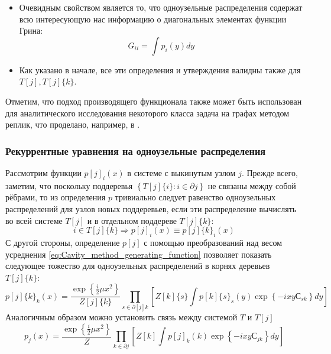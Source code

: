\begin{itemize}
	\item Очевидным свойством является то, что одноузельные распределения содержат всю интересующую нас информацию о диагональных элементах функции Грина:
	\begin{equation}
	\label{eq:Cavity_method_GF_diagonal_elements_through_single_field_distrivution}
	G_{ii} = \int p_i(y) dy
	\end{equation}
	\item Как указано в начале, все эти определения и утверждения валидны также для $T[j], T[j]\{k\}$.
\end{itemize}
Отметим, что подход производящего функционала также может быть использован для аналитического исследования некоторого класса задача на графах методом реплик, что проделано, например, в \cite{Rodgers_Bray_1988}.

\subsubsection{Рекуррентные уравнения на одноузельные распределения}
Рассмотрим функции $p[j]_i(x)$ в системе с выкинутым узлом $j$. Прежде всего, заметим, что поскольку поддеревья $\left\{ T[j]\{i\}: i \in \partial j \right\}$ не связаны между собой рёбрами, то из определения $p$ тривиально следует равенство одноузельных распределений для узлов новых поддеревьев, если эти распределение вычислять во всей системе $T[j]$ и в отдельном поддереве $T[j]\{k\}$:
$$
i \in  T[j]\{k\} \Rightarrow p[j]_i(x) \equiv p[j]\{k\}_i(x)
$$
С другой стороны, определение $p[j]$ с помощью преобразований над весом усреднения \eqref{eq:Cavity_method_generating_function} позволяет показать следующее тожество для одноузельных распределений в корнях деревьев $T[j]\{k\}$:
\begin{equation}
	\label{eq:Single_field_cavity_distribution_recurrence_relation}
	p[j]\{k\}_k(x) = \frac{\exp\left\{ \frac{i}{2}\mu x^2\right\} }{Z[j]\{k\}} \prod\limits_{s \in \partial[j]k} \left[Z[k]\{s\} \int p[k]\{s\}_s(y) \exp\left\{ -i x y С_{sk} \right\} dy \right]
\end{equation}
Аналогичным образом можно установить связь между системой $T$ и $T[j]$
\begin{equation}
	\label{eq:Single_field_distribution_though_cavity_distributions}
	p_j(x) = \frac{\exp\left\{ \frac{i}{2}\mu x^2\right\} }{Z} \prod\limits_{k \in \partial j} \left[Z[k] \int p[j]_k(k) \exp\left\{ -i x y С_{jk} \right\} dy \right]
\end{equation}

